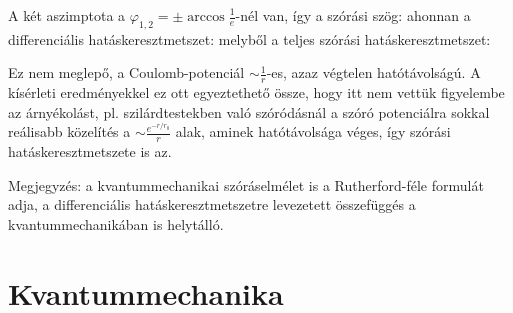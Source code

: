    A két aszimptota a $\varphi_{1,2}=\pm\arccos{\frac{1}{e}}$-nél van, így a szórási szög:
   ahonnan a differenciális hatáskeresztmetszet:
   melyből a teljes szórási hatáskeresztmetszet:
   
   Ez nem meglepő, a Coulomb-potenciál $\sim\frac{1}{r}$-es, azaz végtelen hatótávolságú. A kísérleti eredményekkel ez ott egyeztethető össze, hogy itt nem vettük figyelembe az árnyékolást, pl. szilárdtestekben való szóródásnál a szóró potenciálra sokkal reálisabb közelítés a $\sim\frac{e^{-r/r_0}}{r}$ alak, aminek hatótávolsága véges, így szórási hatáskeresztmetszete is az.
   
   Megjegyzés: a kvantummechanikai szóráselmélet is a Rutherford-féle formulát adja, a differenciális hatáskeresztmetszetre levezetett összefüggés a kvantummechanikában is helytálló. 
   
 \section{Kvantummechanika}
  
